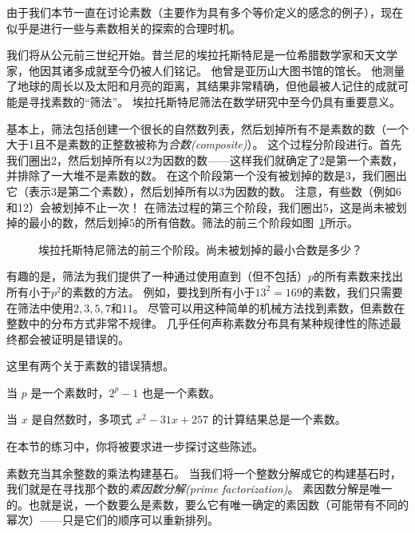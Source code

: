 由于我们本节一直在讨论素数（主要作为具有多个等价定义的感念的例子），现在似乎是进行一些与素数相关的探索的合理时机。

我们将从公元前三世纪开始。昔兰尼的埃拉托斯特尼是一位希腊数学家和天文学家，他因其诸多成就至今仍被人们铭记。
他曾是亚历山大图书馆的馆长。
他测量了地球的周长以及太阳和月亮的距离，其结果非常精确，但他最被人记住的成就可能是寻找素数的“筛法”。
埃拉托斯特尼筛法在数学研究中至今仍具有重要意义。

基本上，筛法包括创建一个很长的自然数列表，然后划掉所有不是素数的数（一个大于1且不是素数的正整数被称为\emph{合数(composite)}）。
这个过程分阶段进行。首先我们圈出2，然后划掉所有以2为因数的数——这样我们就确定了2是第一个素数，并排除了一大堆不是素数的数。
在这个阶段第一个没有被划掉的数是3，我们圈出它（表示3是第二个素数），然后划掉所有以3为因数的数。
注意，有些数（例如6和12）会被划掉不止一次！
在筛法过程的第三个阶段，我们圈出5，这是尚未被划掉的最小的数，然后划掉5的所有倍数。筛法的前三个阶段如图~\ref{fig:sieve}所示。

\begin{figure}[!hbtp]
  
  \caption[埃拉托斯特尼筛法]{埃拉托斯特尼筛法的前三个阶段。尚未被划掉的最小合数是多少？}
  \label{fig:sieve}
\end{figure}

有趣的是，筛法为我们提供了一种通过使用直到（但不包括）$p$的所有素数来找出所有小于$p^2$的素数的方法。
例如，要找到所有小于$13^2 = 169$的素数，我们只需要在筛法中使用$2, 3, 5, 7$和$11$。
尽管可以用这种简单的机械方法找到素数，但素数在整数中的分布方式非常不规律。
几乎任何声称素数分布具有某种规律性的陈述最终都会被证明是错误的。

这里有两个关于素数的错误猜想。

\begin{conj} \label{conj:ferm}
  
  当 $p$ 是一个素数时，$2^p-1$ 也是一个素数。
\end{conj}

\begin{conj} \label{conj:poly}
  
  当 $x$ 是自然数时，多项式 $x^2-31x+257$ 的计算结果总是一个素数。
\end{conj}

在本节的练习中，你将被要求进一步探讨这些陈述。

素数充当其余整数的乘法构建基石。
当我们将一个整数分解成它的构建基石时，我们就是在寻找那个数的\emph{素因数分解(prime factorization)}。
素因数分解是唯一的。也就是说，一个数要么是素数，要么它有唯一确定的素因数（可能带有不同的幂次）——只是它们的顺序可以重新排列。

